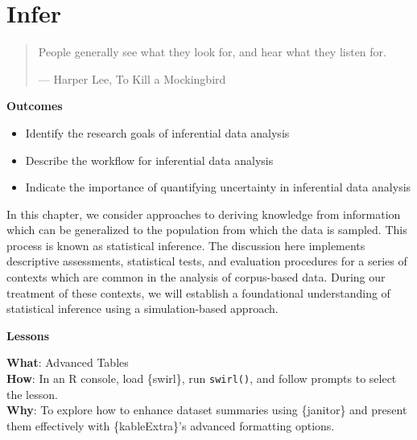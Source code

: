 \documentclass[
  letterpaper,
]{latex/krantz}
\providecommand{\tightlist}{%
  \setlength{\itemsep}{0pt}\setlength{\parskip}{0pt}}\usepackage{longtable,booktabs,array}
\theoremstyle{definition}
\theoremstyle{remark}
\begin{document}
\chapter{Infer}\label{sec-infer-chapter}

\begin{quote}
People generally see what they look for, and hear what they listen for.

--- Harper Lee, To Kill a Mockingbird
\end{quote}

\begin{tcolorbox}[enhanced jigsaw, colback=white, opacityback=0, bottomrule=.15mm, rightrule=.15mm, breakable, left=2mm, arc=.35mm, colframe=quarto-callout-color-frame, leftrule=.75mm, toprule=.15mm]

\textbf{ Outcomes}

\begin{itemize}
\tightlist
\item
  Identify the research goals of inferential data analysis
\item
  Describe the workflow for inferential data analysis
\item
  Indicate the importance of quantifying uncertainty in inferential data
  analysis
\end{itemize}

\end{tcolorbox}

In this chapter, we consider approaches to deriving knowledge from
information which can be generalized to the population from which the
data is sampled. This process is known as statistical inference. The
discussion here implements descriptive assessments, statistical tests,
and evaluation procedures for a series of contexts which are common in
the analysis of corpus-based data. During our treatment of these
contexts, we will establish a foundational understanding of statistical
inference using a simulation-based approach.

\begin{tcolorbox}[enhanced jigsaw, colback=white, opacityback=0, bottomrule=.15mm, rightrule=.15mm, breakable, left=2mm, arc=.35mm, colframe=quarto-callout-color-frame, leftrule=.75mm, toprule=.15mm]

\textbf{ Lessons}

\textbf{What}: Advanced Tables\\
\textbf{How}: In an R console, load \{swirl\}, run \texttt{swirl()}, and
follow prompts to select the lesson.\\
\textbf{Why}: To explore how to enhance dataset summaries using
\{janitor\} and present them effectively with \{kableExtra\}'s advanced
formatting options.

\end{tcolorbox}
\end{document}

